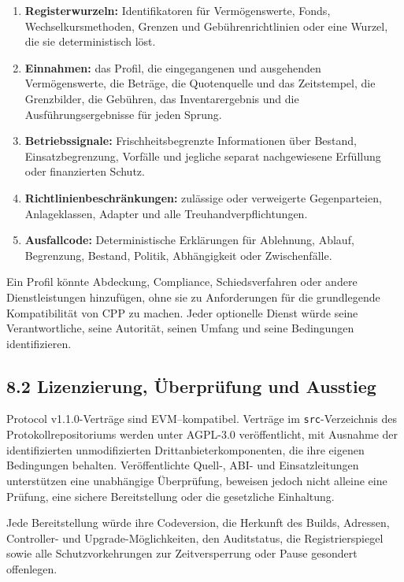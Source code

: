 \documentclass[11pt]{article}
\begin{document}
\begin{enumerate}[leftmargin=*]
\item \textbf{Registerwurzeln:} Identifikatoren für Vermögenswerte, Fonds, Wechselkursmethoden, Grenzen und Gebührenrichtlinien oder eine Wurzel, die sie deterministisch löst.
\item \textbf{Einnahmen:} das Profil, die eingegangenen und ausgehenden Vermögenswerte, die Beträge, die Quotenquelle und das Zeitstempel, die Grenzbilder, die Gebühren, das Inventarergebnis und die Ausführungsergebnisse für jeden Sprung.
\item \textbf{Betriebssignale:} Frischheitsbegrenzte Informationen über Bestand, Einsatzbegrenzung, Vorfälle und jegliche separat nachgewiesene Erfüllung oder finanzierten Schutz.
\item \textbf{Richtlinienbeschränkungen:} zulässige oder verweigerte Gegenparteien, Anlageklassen, Adapter und alle Treuhandverpflichtungen.
\item \textbf{Ausfallcode:} Deterministische Erklärungen für Ablehnung, Ablauf, Begrenzung, Bestand, Politik, Abhängigkeit oder Zwischenfälle.
\end{enumerate}
Ein Profil könnte Abdeckung, Compliance, Schiedsverfahren oder andere Dienstleistungen hinzufügen, ohne sie zu Anforderungen für die grundlegende Kompatibilität von CPP zu machen. Jeder optionelle Dienst würde seine Verantwortliche, seine Autorität, seinen Umfang und seine Bedingungen identifizieren.

\subsection*{8.2 Lizenzierung, Überprüfung und Ausstieg}

Protocol v1.1.0-Verträge sind EVM--kompatibel. Verträge im \texttt{src}-Verzeichnis des Protokollrepositoriums werden unter AGPL-3.0 veröffentlicht, mit Ausnahme der identifizierten unmodifizierten Drittanbieterkomponenten, die ihre eigenen Bedingungen behalten. Veröffentlichte Quell-, ABI- und Einsatzleitungen unterstützen eine unabhängige Überprüfung, beweisen jedoch nicht alleine eine Prüfung, eine sichere Bereitstellung oder die gesetzliche Einhaltung.

Jede Bereitstellung würde ihre Codeversion, die Herkunft des Builds, Adressen, Controller- und Upgrade-Möglichkeiten, den Auditstatus, die Registrierspiegel sowie alle Schutzvorkehrungen zur Zeitversperrung oder Pause gesondert offenlegen.
\end{document}
